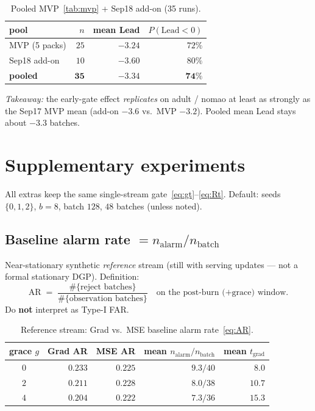 \documentclass[11pt]{article}
\newcommand{\Lead}{\mathrm{Lead}}
\begin{document}
\begin{table}[h]
\centering
\caption{Pooled MVP~\ref{tab:mvp} + Sep18 add-on (35 runs).}
\label{tab:pooled}
\begin{tabular}{lrrr}
\toprule
pool & $n$ & mean Lead & $P(\Lead<0)$ \\
\midrule
MVP (5 packs) & $25$ & $-3.24$ & $72\%$ \\
Sep18 add-on & $10$ & $-3.60$ & $80\%$ \\
\textbf{pooled} & $\mathbf{35}$ & $\mathbf{-3.34}$ & $\mathbf{74\%}$ \\
\bottomrule
\end{tabular}
\end{table}

\noindent\textit{Takeaway:} the early-gate effect \emph{replicates} on
adult / nomao at least as strongly as the Sep17 MVP mean
(add-on $-3.6$ vs.\ MVP $-3.2$). Pooled mean Lead stays about
$-3.3$ batches.

\section{Supplementary experiments}
\label{sec:extras}

All extras keep the same single-stream gate~\eqref{eq:gt}--\eqref{eq:Rt}.
Default: seeds $\{0,1,2\}$, $b=8$, batch $128$, $48$ batches
(unless noted).

\subsection{Baseline alarm rate $= n_{\mathrm{alarm}}/n_{\mathrm{batch}}$}
\label{sec:null}

Near-stationary synthetic \emph{reference} stream (still with serving
updates --- not a formal stationary DGP). Definition:
\begin{equation*}
  \mathrm{AR}
  \;=\;
  \frac{\#\{\text{reject batches}\}}{\#\{\text{observation batches}\}}
  \quad\text{on the post-burn (+grace) window.}
\end{equation*}
Do \textbf{not} interpret as Type-I FAR.

\begin{table}[h]
\centering
\caption{Reference stream: Grad vs.\ MSE baseline alarm rate~\eqref{eq:AR}.}
\label{tab:null}
\begin{tabular}{crrrr}
\toprule
grace $g$ & Grad AR & MSE AR & mean $n_{\mathrm{alarm}}/n_{\mathrm{batch}}$ & mean $t_{\mathrm{grad}}$ \\
\midrule
$0$ & $0.233$ & $0.225$ & $9.3/40$ & $8.0$ \\
$2$ & $0.211$ & $0.228$ & $8.0/38$ & $10.7$ \\
$4$ & $0.204$ & $0.222$ & $7.3/36$ & $15.3$ \\
\bottomrule
\end{tabular}
\end{table}
\end{document}
